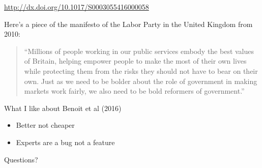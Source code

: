 \documentclass[aspectratio=169]{beamer}
\begin{document}
\begin{frame}

\begin{center}
\end{center}

\vfill
{\tiny \url{http://dx.doi.org/10.1017/S0003055416000058}}

\end{frame}
\begin{frame}

Here's a piece of the manifesto of the Labor Party in the United Kingdom from 2010:

\begin{quote}
``Millions of people working in our public services embody the best values of Britain, helping empower people to make the most of their own lives while protecting them from the risks they should not have to bear on their own. Just as we need to be bolder about the role of government in making markets work fairly, we also need to be bold reformers of government.''
\end{quote}

\end{frame}
\begin{frame}

\begin{center}
\end{center}

\end{frame}
\begin{frame}

What I like about Benoit et al (2016)
\begin{itemize}
\item Better not cheaper
\pause
\item Experts are a bug not a feature
\end{itemize}

\end{frame}
\begin{frame}

{\Large
\begin{center}
Questions?
\end{center}
}

\end{frame}
\end{document}
